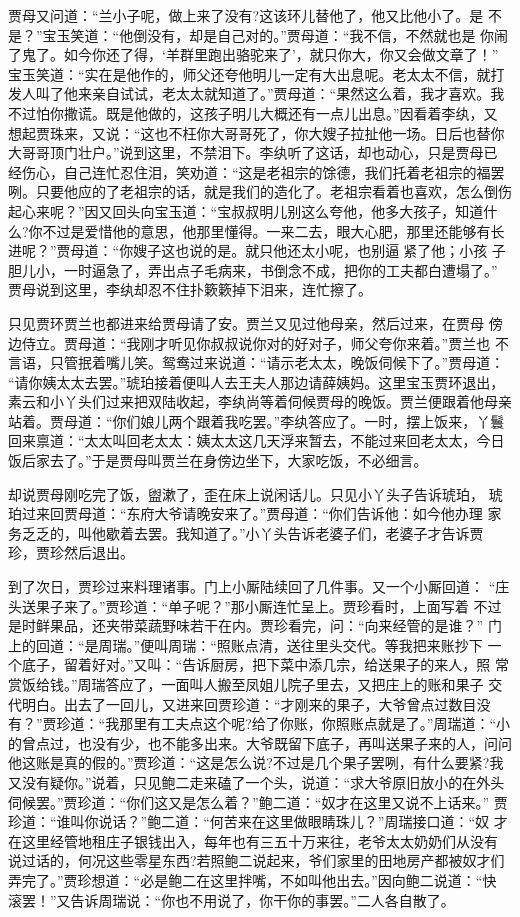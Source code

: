 贾母又问道：“兰小子呢，做上来了没有?这该环儿替他了，他又比他小了。是
不是？”宝玉笑道：“他倒没有，却是自己对的。”贾母道：“我不信，不然就也是
你闹了鬼了。如今你还了得，‘羊群里跑出骆驼来了’，就只你大，你又会做文章了！”
宝玉笑道：“实在是他作的，师父还夸他明儿一定有大出息呢。老太太不信，就打
发人叫了他来亲自试试，老太太就知道了。”贾母道：“果然这么着，我才喜欢。我
不过怕你撒谎。既是他做的，这孩子明儿大概还有一点儿出息。”因看着李纨，又
想起贾珠来，又说：“这也不枉你大哥哥死了，你大嫂子拉扯他一场。日后也替你
大哥哥顶门壮户。”说到这里，不禁泪下。李纨听了这话，却也动心，只是贾母已
经伤心，自己连忙忍住泪，笑劝道：“这是老祖宗的馀德，我们托着老祖宗的福罢
咧。只要他应的了老祖宗的话，就是我们的造化了。老祖宗看着也喜欢，怎么倒伤
起心来呢？”因又回头向宝玉道：“宝叔叔明儿别这么夸他，他多大孩子，知道什
么?你不过是爱惜他的意思，他那里懂得。一来二去，眼大心肥，那里还能够有长
进呢？”贾母道：“你嫂子这也说的是。就只他还太小呢，也别逼紧了他；小孩
子胆儿小，一时逼急了，弄出点子毛病来，书倒念不成，把你的工夫都白遭塌了。”
贾母说到这里，李纨却忍不住扑簌簌掉下泪来，连忙擦了。

只见贾环贾兰也都进来给贾母请了安。贾兰又见过他母亲，然后过来，在贾母
傍边侍立。贾母道：“我刚才听见你叔叔说你对的好对子，师父夸你来着。”贾兰也
不言语，只管抿着嘴儿笑。鸳鸯过来说道：“请示老太太，晚饭伺候下了。”贾母道：
“请你姨太太去罢。”琥珀接着便叫人去王夫人那边请薛姨妈。这里宝玉贾环退出，
素云和小丫头们过来把双陆收起，李纨尚等着伺候贾母的晚饭。贾兰便跟着他母亲
站着。贾母道：“你们娘儿两个跟着我吃罢。”李纨答应了。一时，摆上饭来，丫鬟
回来禀道：“太太叫回老太太：姨太太这几天浮来暂去，不能过来回老太太，今日
饭后家去了。”于是贾母叫贾兰在身傍边坐下，大家吃饭，不必细言。

却说贾母刚吃完了饭，盥漱了，歪在床上说闲话儿。只见小丫头子告诉琥珀，
琥珀过来回贾母道：“东府大爷请晚安来了。”贾母道：“你们告诉他：如今他办理
家务乏乏的，叫他歇着去罢。我知道了。”小丫头告诉老婆子们，老婆子才告诉贾
珍，贾珍然后退出。

到了次日，贾珍过来料理诸事。门上小厮陆续回了几件事。又一个小厮回道：
“庄头送果子来了。”贾珍道：“单子呢？”那小厮连忙呈上。贾珍看时，上面写着
不过是时鲜果品，还夹带菜蔬野味若干在内。贾珍看完，问：“向来经管的是谁？”
门上的回道：“是周瑞。”便叫周瑞：“照账点清，送往里头交代。等我把来账抄下
一个底子，留着好对。”又叫：“告诉厨房，把下菜中添几宗，给送果子的来人，照
常赏饭给钱。”周瑞答应了，一面叫人搬至凤姐儿院子里去，又把庄上的账和果子
交代明白。出去了一回儿，又进来回贾珍道：“才刚来的果子，大爷曾点过数目没
有？”贾珍道：“我那里有工夫点这个呢?给了你账，你照账点就是了。”周瑞道：“小
的曾点过，也没有少，也不能多出来。大爷既留下底子，再叫送果子来的人，问问
他这账是真的假的。”贾珍道：“这是怎么说?不过是几个果子罢咧，有什么要紧?我
又没有疑你。”说着，只见鲍二走来磕了一个头，说道：“求大爷原旧放小的在外头
伺候罢。”贾珍道：“你们这又是怎么着？”鲍二道：“奴才在这里又说不上话来。”
贾珍道：“谁叫你说话？”鲍二道：“何苦来在这里做眼睛珠儿？”周瑞接口道：“奴
才在这里经管地租庄子银钱出入，每年也有三五十万来往，老爷太太奶奶们从没有
说过话的，何况这些零星东西?若照鲍二说起来，爷们家里的田地房产都被奴才们
弄完了。”贾珍想道：“必是鲍二在这里拌嘴，不如叫他出去。”因向鲍二说道：“快
滚罢！”又告诉周瑞说：“你也不用说了，你干你的事罢。”二人各自散了。

